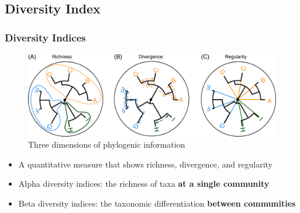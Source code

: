 \documentclass{beamer}
\begin{document}
    \subsection{Diversity Index}
    \begin{frame}
        \frametitle{Diversity Indices}

        \begin{figure}
            \includegraphics[width=0.6 \linewidth]{figures/phylogenic.jpg}
            \caption{Three dimensions of phylogenic information \protect\cite{phylogenetic1}}
        \end{figure}

        \begin{itemize}
            \item A quantitative measure that shows richness, divergence, and regularity \cite{phylogenetic1}
            \item Alpha diversity indices: the richness of taxa \textbf{at a single community}
            \item Beta diversity indices: the taxonomic differentiation \textbf{between communities}
        \end{itemize}
    \end{frame}
\end{document}

